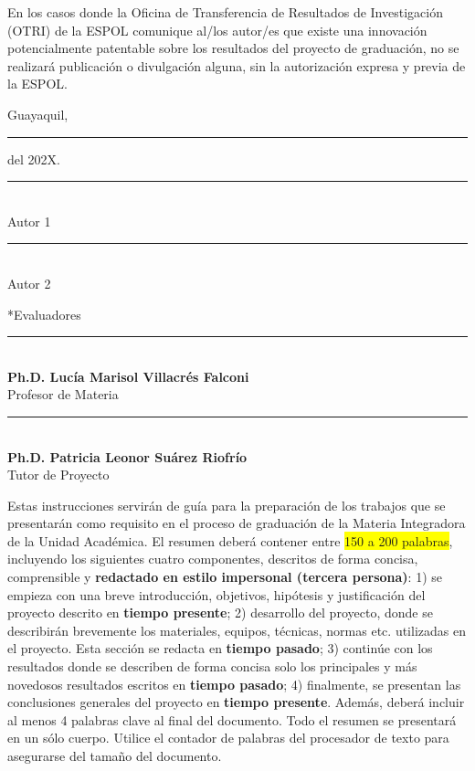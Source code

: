 \documentclass[12pt,oneside]{report}
\makeatletter
\newcommand{\resaltarcaja}[1]{\colorbox{yellow}{#1}}
\let\resaltar\resaltarcaja\let\subrayar\underline}
\newcommand{\encabezado}{\@ifstar{\@encabezadoS}{\@encabezadoN}}
\newcommand{\@encabezadoN}[1]{%
  \phantomsection\addcontentsline{toc}{chapter}{#1}%
  {\centering\bfseries #1\par}}
\newcommand{\@encabezadoS}[1]{{\centering\bfseries #1\par}}
\newcommand{\firma}[2]{%
  \begin{minipage}[t]{0.42\textwidth}\centering\singlespacing
    \rule{\linewidth}{0.5pt}\\ #1\\ #2
  \end{minipage}}
\makeatother
\begin{document}
En los casos donde la Oficina de Transferencia de Resultados de Investigación (OTRI) de la ESPOL comunique al/los autor/es que existe una innovación potencialmente patentable sobre los resultados del proyecto de graduación, no se realizará publicación o divulgación alguna, sin la autorización expresa y previa de la ESPOL.

Guayaquil, \rule{3.5cm}{0.4pt} del 202X.

\vspace{2cm}
\noindent\firma{Autor 1}{}\hfill\firma{Autor 2}{}
\endgroup

\clearpage
\encabezado*{Evaluadores}
\vspace{4cm}
\noindent\firma{\textbf{Ph.D. Lucía Marisol Villacrés Falconi}}{Profesor de Materia}\hfill
\firma{\textbf{Ph.D. Patricia Leonor Suárez Riofrío}}{Tutor de Proyecto}

\bigskip

\clearpage
{}
\pagestyle{fancy}

\encabezado{Resumen}
\noindent Estas instrucciones servirán de guía para la preparación de los trabajos que se presentarán como requisito en el proceso de graduación de la Materia Integradora de la Unidad Académica. El resumen deberá contener entre \resaltar{150 a 200 palabras}, incluyendo los siguientes cuatro componentes, descritos de forma concisa, comprensible y \textbf{redactado en estilo impersonal (tercera persona)}: 1) se empieza con una breve introducción, objetivos, hipótesis y justificación del proyecto descrito en \textbf{tiempo presente}; 2) desarrollo del proyecto, donde se describirán brevemente los materiales, equipos, técnicas, normas etc. utilizadas en el proyecto. Esta sección se redacta en \textbf{tiempo pasado}; 3) continúe con los resultados donde se describen de forma concisa solo los principales y más novedosos resultados escritos en \textbf{tiempo pasado}; 4) finalmente, se presentan las conclusiones generales del proyecto en \textbf{tiempo presente}. Además, deberá incluir al menos 4 palabras clave al final del documento. Todo el resumen se presentará en un sólo cuerpo. Utilice el contador de palabras del procesador de texto para asegurarse del tamaño del documento.
\end{document}
